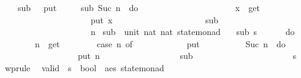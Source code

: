 \begin{isabellebody}
\ \ \ \ {\isachardoublequoteopen}sub{}\ {}\ {\isacharequal}{\kern0pt}\ put\ {}\ {}{\isachardoublequoteclose}\isanewline
\ \ {\isacharbar}{\kern0pt}\ {\isachardoublequoteopen}sub{}\ {\isacharparenleft}{\kern0pt}Suc\ n{\isacharparenright}{\kern0pt}\ {\isacharequal}{\kern0pt}\ {\isacharparenleft}{\kern0pt}do\ {\isacharbraceleft}{\kern0pt}\isanewline
\ \ \ \ \ \ \ \ \ \ \ \ \ \ \ \ \ \ \ \ \ x\ {\isasymleftarrow}\ get{\isacharsemicolon}{\kern0pt}\isanewline
\ \ \ \ \ \ \ \ \ \ \ \ \ \ \ \ \ \ \ \ \ put\ x{\isacharsemicolon}{\kern0pt}\isanewline
\ \ \ \ \ \ \ \ \ \ \ \ \ \ \ \ \ \ \ \ \ sub{}\isanewline
\ \ \ \ \ \ \ \ \ \ \ \ \ \ \ \ \ \ \ \ {\isacharbraceright}{\kern0pt}{\isacharparenright}{\kern0pt}\ n{\isachardoublequoteclose}\isanewline
\isanewline
{}\isamarkupfalse%
\ sub{}\ {\isacharcolon}{\kern0pt}{\isacharcolon}{\kern0pt}\ {\isachardoublequoteopen}{\isacharparenleft}{\kern0pt}unit{\isacharcomma}{\kern0pt}\ nat{\isacharcomma}{\kern0pt}\ nat{\isacharparenright}{\kern0pt}\ state{\isacharunderscore}{\kern0pt}monad{\isachardoublequoteclose}\ \isanewline
\ \ {\isachardoublequoteopen}sub{}\ s\ {\isacharequal}{\kern0pt}\isanewline
\ \ \ \ \ {\isacharparenleft}{\kern0pt}do\ {\isacharbraceleft}{\kern0pt}\isanewline
\ \ \ \ \ \ \ \ n\ {\isasymleftarrow}\ get{\isacharsemicolon}{\kern0pt}\isanewline
\ \ \ \ \ \ \ \ {\isacharparenleft}{\kern0pt}case\ n\ of\isanewline
\ \ \ \ \ \ \ \ \ \ {}\ {\isasymRightarrow}\ put\ {}\isanewline
\ \ \ \ \ \ \ \ {\isacharbar}{\kern0pt}\ Suc\ n{\isacharprime}{\kern0pt}\ {\isasymRightarrow}\ {\isacharparenleft}{\kern0pt}do\ {\isacharbraceleft}{\kern0pt}\isanewline
\ \ \ \ \ \ \ \ \ \ \ \ \ \ \ \ \ \ put\ n{\isacharprime}{\kern0pt}{\isacharsemicolon}{\kern0pt}\isanewline
\ \ \ \ \ \ \ \ \ \ \ \ \ \ \ \ \ \ sub{}\isanewline
\ \ \ \ \ \ \ \ \ \ \ \ \ \ \ \ {\isacharbraceright}{\kern0pt}{\isacharparenright}{\kern0pt}{\isacharparenright}{\kern0pt}\isanewline
\ \ \ \ \ {\isacharbraceright}{\kern0pt}{\isacharparenright}{\kern0pt}\ s{\isachardoublequoteclose}%
\isadelimdocument
%
\endisadelimdocument
%
\isatagdocument
%
\isamarkuptrue%
%
\endisatagdocument
{\isafolddocument}%
%
\isadelimdocument
%
\endisadelimdocument
{}\isamarkupfalse%
\ wprule\isanewline
\isanewline
{}\isamarkupfalse%
\isanewline
\ \ valid\ {\isacharcolon}{\kern0pt}{\isacharcolon}{\kern0pt}\ {\isachardoublequoteopen}{\isacharparenleft}{\kern0pt}{\isacharprime}{\kern0pt}s\ {\isasymRightarrow}\ bool{\isacharparenright}{\kern0pt}\ {\isasymRightarrow}\ {\isacharparenleft}{\kern0pt}{\isacharprime}{\kern0pt}a{\isacharcomma}{\kern0pt}{\isacharprime}{\kern0pt}e{\isacharcomma}{\kern0pt}{\isacharprime}{\kern0pt}s{\isacharparenright}{\kern0pt}\ state{\isacharunderscore}{\kern0pt}monad\ {\isasymRightarrow}\ \isanewline

\end{isabellebody}
